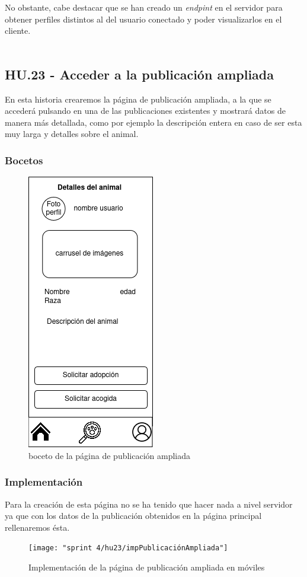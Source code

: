 No obstante, cabe destacar que se han creado un \textit{endpint} en el servidor para obtener perfiles distintos al del usuario conectado y poder visualizarlos en el cliente. \\ \\


\subsection{HU.23 - Acceder a la publicación ampliada}
 
 En esta historia crearemos la página de publicación ampliada, a la que se accederá pulsando en una de las publicaciones existentes y mostrará datos de manera más detallada, como por ejemplo la descripción entera en caso de ser esta muy larga y detalles sobre el animal. \\

\subsubsection{Bocetos}

\begin{figure}[H]
	\centering
	\includegraphics[width=0.31\linewidth]{"sprint 4/hu23/publicacionAmpliada"}
	\caption{boceto de la página de publicación ampliada}
	\label{fig:publicacionampliada}
\end{figure}

\subsubsection{Implementación}

Para la creación de esta página no se ha tenido que hacer nada a nivel servidor ya que con los datos de la publicación obtenidos en la página principal rellenaremos ésta.
\begin{figure}[H]
	\centering
	\texttt{[image: "sprint 4/hu23/impPublicaciónAmpliada"]}
	\caption{Implementación de la página de publicación ampliada en móviles}
	\label{fig:imppublicacionampliada}
\end{figure}

